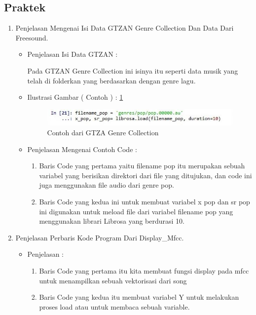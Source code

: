 \subsection{Praktek}
\begin{enumerate}
\item Penjelasan Mengenai Isi Data GTZAN Genre Collection Dan Data Dari Freesound.
\begin{itemize}
\item Penjelasan Isi Data GTZAN :
\par Pada GTZAN Genre Collection ini isinya itu seperti data musik yang telah di folderkan yang berdasarkan dengan genre lagu.
\par
\item Ilustrasi Gambar ( Contoh ) : \ref{cahya-chapter6-1}
\par
\begin{figure}[!hbtp]
\centering
\includegraphics[scale=0.2]{figures/cahya-chapter6-1.jpg}
\caption{Contoh dari GTZA Genre Collection}
\label{cahya-chapter6-1}
\end{figure}
\par
\item Penjelasan Mengenai Contoh Code :
\begin{enumerate}
\item Baris Code yang pertama yaitu filename pop itu merupakan sebuah variabel yang berisikan direktori dari file yang ditujukan, dan code ini juga menggunakan file audio dari genre pop.
\item Baris Code yang kedua ini untuk membuat variabel x pop dan sr pop ini digunakan untuk meload file dari variabel filename pop yang menggunakan librari Librosa yang berdurasi 10.
\end{enumerate}
\end{itemize}
\par
\item Penjelasan Perbaris Kode Program Dari Display\_Mfcc.
\begin{itemize}
\item Penjelasan :
\par
\begin{enumerate}
\item Baris Code yang pertama itu kita membuat fungsi display pada mfcc untuk menampilkan sebuah vektorisasi dari song
\item Baris Code yang kedua itu membuat variabel Y untuk melakukan proses load atau untuk membaca sebuah variable. 

\end{enumerate}
\end{itemize}
\end{enumerate}
